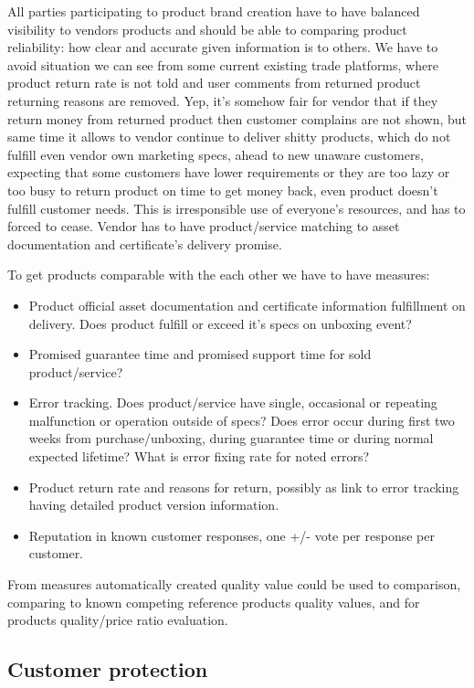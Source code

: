 All parties participating to product brand creation have to have balanced visibility to vendors products and should be able to comparing product reliability: how clear and accurate given information is to others. We have to avoid situation we can see from some current existing trade platforms, where product return rate is not told and user comments from returned product returning reasons are removed. Yep, it's somehow fair for vendor that if they return money from returned product then customer complains are not shown, but same time it allows to vendor continue to deliver shitty products, which do not fulfill even vendor own marketing specs, ahead to new unaware customers, expecting that some customers have lower requirements or they are too lazy or too busy to return product on time to get money back, even product doesn't fulfill customer needs. This is irresponsible use of everyone's resources, and has to forced to cease. Vendor has to have product/service matching to asset documentation and certificate's delivery promise.

To get products comparable with the each other we have to have measures:
\begin{itemize}
\item Product official asset documentation and certificate information fulfillment on delivery. Does product fulfill or exceed it's specs on unboxing event?
\item Promised guarantee time and promised support time for sold product/service?
\item Error tracking. Does product/service have single, occasional or repeating malfunction or operation outside of specs? Does error occur during first two weeks from purchase/unboxing, during guarantee time or during normal expected lifetime? What is error fixing rate for noted errors?
\item Product return rate and reasons for return, possibly as link to error tracking having detailed product version information.
\item Reputation in known customer responses, one +/- vote per response per customer.
\end{itemize}

From measures automatically created quality value could be used to comparison, comparing to known competing reference products quality values, and for products quality/price ratio evaluation.

\subsection{Customer protection}
\label{customer_protection}

